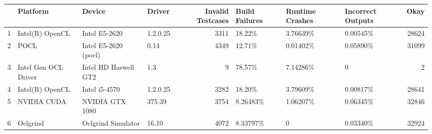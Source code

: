 \begin{tabular}{llllrlllr}
\toprule
{} &              Platform &                Device &    Driver &  Invalid Testcases & Build Failures & Runtime Crashes & Incorrect Outputs &   Okay \\
\midrule
1 &       Intel(R) OpenCL &         Intel E5-2620 &  1.2.0.25 &               3311 &         18.22\% &        3.76639\% &          0.00545\% &  28624 \\
2 &                  POCL &  Intel E5-2620 (pocl) &      0.14 &               4349 &         12.71\% &        0.01402\% &          0.05890\% &  31099 \\
3 &  Intel Gen OCL Driver &  Intel HD Haswell GT2 &       1.3 &                  9 &         78.57\% &        7.14286\% &                 0 &      2 \\
4 &       Intel(R) OpenCL &         Intel i5-4570 &  1.2.0.25 &               3282 &         18.20\% &        3.79609\% &          0.00817\% &  28641 \\
5 &           NVIDIA CUDA &       NVIDIA GTX 1080 &    375.39 &               3754 &       8.26483\% &        1.06207\% &          0.06345\% &  32846 \\
6 &              Oclgrind &    Oclgrind Simulator &     16.10 &               4072 &       8.33797\% &               0 &          0.03340\% &  32924 \\
\bottomrule
\end{tabular}
